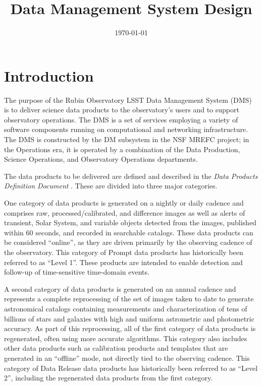 \documentclass[DM,toc,lsstdraft]{lsstdoc}
\title{Data Management System Design}
\date{\today}
\begin{document}
\maketitle

\section{Introduction}\label{introduction}

The purpose of the Rubin Observatory LSST Data Management System (DMS) is to deliver science data
products to the observatory's users and to support observatory operations.  The
DMS is a set of services employing a variety of software components running on
computational and networking infrastructure.  The DMS is constructed by the DM
subsystem in the NSF MREFC project; in the Operations era, it is operated by a
combination of the Data Production, Science Operations, and Observatory
Operations departments.

The data products to be delivered are defined and described in the \textit{Data
Products Definition Document} . These are divided into three
major categories.

One category of data products is generated on a nightly or daily cadence
and comprises raw, processed/calibrated, and difference images as well as alerts
of transient, Solar System, and variable objects detected from the images,
published within 60 seconds, and recorded in searchable catalogs. These
data products can be considered ``online'', as they are driven primarily
by the observing cadence of the observatory. This category of Prompt data products has
historically been referred to as ``Level 1''.  These products are intended to
enable detection and follow-up of time-sensitive time-domain events.

A second category of data products is generated on an annual cadence and
represents a complete reprocessing of the set of images taken to date to
generate astronomical catalogs containing measurements and
characterization of tens of billions of stars and galaxies with high and
uniform astrometric and photometric accuracy. As part of this
reprocessing, all of the first category of data products is regenerated,
often using more accurate algorithms. This category also includes other
data products such as calibration products and templates that are
generated in an ``offline'' mode, not directly tied to the observing
cadence. This category of Data Release data products has historically been referred to as ``Level 2'',
including the regenerated data products from the first category.
\end{document}
